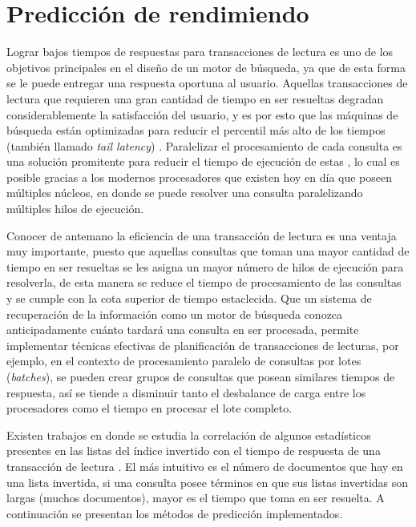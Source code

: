 \chapter{Predicción de rendimiendo}
\label{cap:prediccion}
Lograr bajos tiempos de respuestas para transacciones de lectura es uno de los objetivos principales en el diseño de un motor de búsqueda, ya que de esta forma se le puede entregar una respuesta oportuna al usuario. Aquellas transacciones de lectura que requieren una gran cantidad de tiempo en ser resueltas degradan considerablemente la satisfacción del usuario, y es por esto que las máquinas de búsqueda están optimizadas para reducir el percentil más alto de los tiempos (también llamado \textit{tail latency}) \citep{Jeon:2014}. Paralelizar el procesamiento de cada consulta es una solución promitente para reducir el tiempo de ejecución de estas \citep{Jeon:2013, Tatikonda:2011}, lo cual es posible gracias a los modernos procesadores que existen hoy en día que poseen múltiples núcleos, en donde se puede resolver una consulta paralelizando múltiples hilos de ejecución.

Conocer de antemano la eficiencia de una transacción de lectura es una ventaja muy importante, puesto que aquellas consultas que toman una mayor cantidad de tiempo en ser resueltas se les asigna un mayor número de hilos de ejecución para resolverla, de esta manera se reduce el tiempo de procesamiento de las consultas y se cumple con la cota superior de tiempo estaclecida. Que un sistema de recuperación de la información como un motor de búsqueda conozca anticipadamente cuánto tardará una consulta en ser procesada, permite implementar técnicas efectivas de planificación de transacciones de lecturas, por ejemplo, en el contexto de procesamiento paralelo de consultas por lotes (\textit{batches}), se pueden crear grupos de consultas que posean similares tiempos de respuesta, así se tiende a disminuir tanto el desbalance de carga entre los procesadores como el tiempo en procesar el lote completo.

Existen trabajos en donde se estudia la correlación de algunos estadísticos presentes en las listas del índice invertido con el tiempo de respuesta de una transacción de lectura \citep{Macdonald:2012, Hauff:2010, He:2004}. El más intuitivo es el número de documentos que hay en una lista invertida, si una consulta posee términos en que sus listas invertidas son largas (muchos documentos), mayor es el tiempo que toma en ser resuelta. A continuación se presentan los métodos de predicción implementados.  

